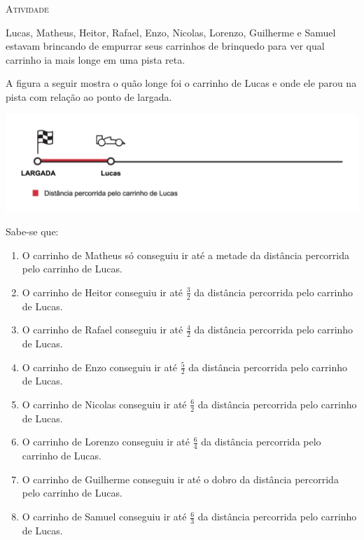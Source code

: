 \documentclass[10 pt,usenames,dvipsnames, oneside]{article}
\begin{document}
\begin{goals}
\end{goals}

\bigskip
\begin{center}
{\large \scshape Atividade}
\end{center}
\fi

Lucas, Matheus, Heitor, Rafael, Enzo, Nicolas, Lorenzo, Guilherme e Samuel estavam brincando de empurrar seus carrinhos de brinquedo para ver qual carrinho ia mais longe em uma pista reta.

A figura a seguir mostra o quão longe foi o carrinho de Lucas e onde ele parou na pista com relação ao ponto de largada.

\begin{center}
\includegraphics[width=450pt, keepaspectratio]{ativ12_fig01.png}
\end{center}

Sabe-se que:

\begin{enumerate} [label=\alph*)] %
  \item     O carrinho de Matheus só conseguiu ir até a metade da distância percorrida pelo carrinho de Lucas.
  \item     O carrinho de Heitor conseguiu ir até     $\frac{3}{2}$     da distância percorrida pelo carrinho de Lucas.
  \item     O carrinho de Rafael conseguiu ir até     $\frac{4}{2}$     da distância percorrida pelo carrinho de Lucas.
  \item     O carrinho de Enzo conseguiu ir até     $\frac{5}{2}$     da distância percorrida pelo carrinho de Lucas.
  \item     O carrinho de Nicolas conseguiu ir até     $\frac{6}{2}$     da distância percorrida pelo carrinho de Lucas.
  \item     O carrinho de Lorenzo conseguiu ir até     $\frac{6}{4}$     da distância percorrida pelo carrinho de Lucas.
  \item     O carrinho de Guilherme conseguiu ir até o dobro da distância percorrida pelo carrinho de Lucas.
  \item     O carrinho de Samuel conseguiu ir até     $\frac{6}{3}$     da distância percorrida pelo carrinho de Lucas.
\end{enumerate} %
\end{document}
